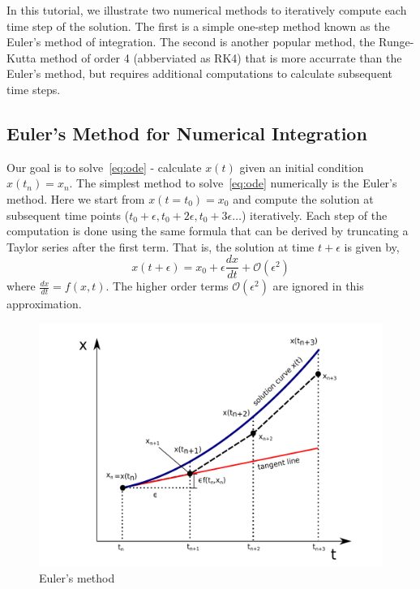 \documentclass[10pt,letterpaper]{article}
\begin{document}
In this tutorial, we illustrate two numerical methods to iteratively compute each time step of the solution. The first is a simple one-step method known as the Euler's method of integration. The second is another popular method, the Runge-Kutta method of order 4 (abberviated as RK4) that is more accurrate than the Euler's method, but requires additional computations to calculate subsequent time steps. 

\subsection*{Euler's Method for Numerical Integration}
Our goal is to solve~\ref{eq:ode} - calculate $x(t)$ given an initial condition $x(t_n)=x_{n}$. The simplest method to solve~\ref{eq:ode} numerically is the Euler's method. Here we start from $x(t=t_{0})=x_{0}$ and compute the solution at subsequent time points ($t_{0}+\epsilon,t_{0}+2\epsilon,t_{0}+3\epsilon \dots $) iteratively. Each step of the computation is done using the same formula that can be derived by truncating a Taylor series after the first term. That is, the solution at time $t+\epsilon$ is given by,
\begin{equation}
x(t+\epsilon) = x_{0} + \epsilon\frac{dx}{dt} + \mathcal{O}(\epsilon^2)
\label{eq:euler}
\end{equation}
where $\frac{dx}{dt}=f(x,t)$. The higher order terms $\mathcal{O}(\epsilon^2)$ are ignored in this approximation. 

\begin{figure}
\includegraphics[scale=0.4]{Figures/fig1.pdf} 
\caption{Euler's method}
\label{fig:euler}
\end{figure}
\end{document}
